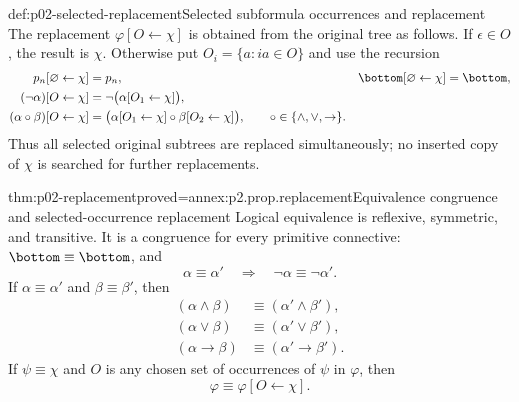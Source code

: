 \begin{hbdefinition}{def:p02-selected-replacement}{Selected subformula occurrences and replacement}
The replacement \(\varphi[O\leftarrow\chi]\) is obtained from the original
tree as follows.  If \(\epsilon\in O\), the result is \(\chi\).  Otherwise put
\(O_i=\{a:ia\in O\}\) and use the recursion
\[
\begin{aligned}
 p_n[\varnothing\leftarrow\chi]&=p_n,&
 \bottom[\varnothing\leftarrow\chi]&=\bottom,\\
 (\neg\alpha)[O\leftarrow\chi]
   &=\neg\bigl(\alpha[O_1\leftarrow\chi]\bigr),\\
 (\alpha\circ\beta)[O\leftarrow\chi]
   &=\bigl(\alpha[O_1\leftarrow\chi]\circ
           \beta[O_2\leftarrow\chi]\bigr),
 \qquad \circ\in\{\land,\lor,\to\}.
\end{aligned}
\]
Thus all selected original subtrees are replaced simultaneously; no inserted
copy of \(\chi\) is searched for further replacements.
\end{hbdefinition}

\begin{hbtheorem}{thm:p02-replacement}{proved=annex:p2.prop.replacement}{Equivalence congruence and selected-occurrence replacement}
Logical equivalence is reflexive, symmetric, and transitive.  It is a
congruence for every primitive connective: \(\bottom\equiv\bottom\), and
\[
 \alpha\equiv\alpha'
   \quad\Longrightarrow\quad \neg\alpha\equiv\neg\alpha'.
\]
If \(\alpha\equiv\alpha'\) and \(\beta\equiv\beta'\), then
\[
\begin{aligned}
 (\alpha\land\beta)&\equiv(\alpha'\land\beta'),\\
 (\alpha\lor\beta)&\equiv(\alpha'\lor\beta'),\\
 (\alpha\to\beta)&\equiv(\alpha'\to\beta').
\end{aligned}
\]
If \(\psi\equiv\chi\) and \(O\) is any chosen set of occurrences of
\(\psi\) in \(\varphi\), then
\[
 \varphi\equiv\varphi[O\leftarrow\chi].
\]
\end{hbtheorem}


